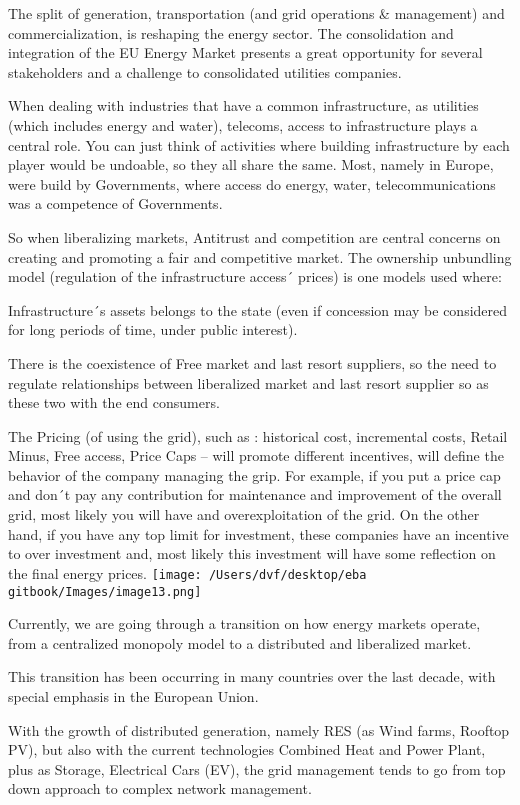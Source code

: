 \documentclass[]{book}
\theoremstyle{definition}
\theoremstyle{definition}
\theoremstyle{definition}
\theoremstyle{remark}
\begin{document}
The split of generation, transportation (and grid operations \&
management) and commercialization, is reshaping the energy sector. The
consolidation and integration of the EU Energy Market presents a great
opportunity for several stakeholders and a challenge to consolidated
utilities companies.

When dealing with industries that have a common infrastructure, as
utilities (which includes energy and water), telecoms, access to
infrastructure plays a central role. You can just think of activities
where building infrastructure by each player would be undoable, so they
all share the same. Most, namely in Europe, were build by Governments,
where access do energy, water, telecommunications was a competence of
Governments.

So when liberalizing markets, Antitrust and competition are central
concerns on creating and promoting a fair and competitive market. The
ownership unbundling model (regulation of the infrastructure access´
prices) is one models used where:

Infrastructure´s assets belongs to the state (even if concession may be
considered for long periods of time, under public interest).

There is the coexistence of Free market and last resort suppliers, so
the need to regulate relationships between liberalized market and last
resort supplier so as these two with the end consumers.

The Pricing (of using the grid), such as : historical cost, incremental
costs, Retail Minus, Free access, Price Caps -- will promote different
incentives, will define the behavior of the company managing the grip.
For example, if you put a price cap and don´t pay any contribution for
maintenance and improvement of the overall grid, most likely you will
have and overexploitation of the grid. On the other hand, if you have
any top limit for investment, these companies have an incentive to over
investment and, most likely this investment will have some reflection on
the final energy prices.
\texttt{[image: /Users/dvf/desktop/eba gitbook/Images/image13.png]}

Currently, we are going through a transition on how energy markets
operate, from a centralized monopoly model to a distributed and
liberalized market.

This transition has been occurring in many countries over the last
decade, with special emphasis in the European Union.

With the growth of distributed generation, namely RES (as Wind farms,
Rooftop PV), but also with the current technologies Combined Heat and
Power Plant, plus as Storage, Electrical Cars (EV), the grid management
tends to go from top down approach to complex network management.
\end{document}
